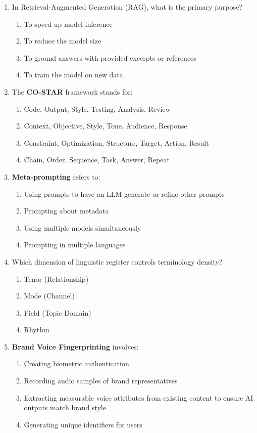 \documentclass[11pt]{article}
\begin{document}
\begin{enumerate}
\item In Retrieval-Augmented Generation (RAG), what is the primary purpose?
\begin{enumerate}[label=\Alph*)]
    \item To speed up model inference
    \item To reduce the model size
    \item To ground answers with provided excerpts or references
    \item To train the model on new data
\end{enumerate}

\item The \textbf{CO-STAR} framework stands for:
\begin{enumerate}[label=\Alph*)]
    \item Code, Output, Style, Testing, Analysis, Review
    \item Context, Objective, Style, Tone, Audience, Response
    \item Constraint, Optimization, Structure, Target, Action, Result
    \item Chain, Order, Sequence, Task, Answer, Repeat
\end{enumerate}

\item \textbf{Meta-prompting} refers to:
\begin{enumerate}[label=\Alph*)]
    \item Using prompts to have an LLM generate or refine other prompts
    \item Prompting about metadata
    \item Using multiple models simultaneously
    \item Prompting in multiple languages
\end{enumerate}

\item Which dimension of linguistic register controls terminology density?
\begin{enumerate}[label=\Alph*)]
    \item Tenor (Relationship)
    \item Mode (Channel)
    \item Field (Topic Domain)
    \item Rhythm
\end{enumerate}

\item \textbf{Brand Voice Fingerprinting} involves:
\begin{enumerate}[label=\Alph*)]
    \item Creating biometric authentication
    \item Recording audio samples of brand representatives
    \item Extracting measurable voice attributes from existing content to ensure AI outputs match brand style
    \item Generating unique identifiers for users
\end{enumerate}


\end{enumerate}
\end{document}
